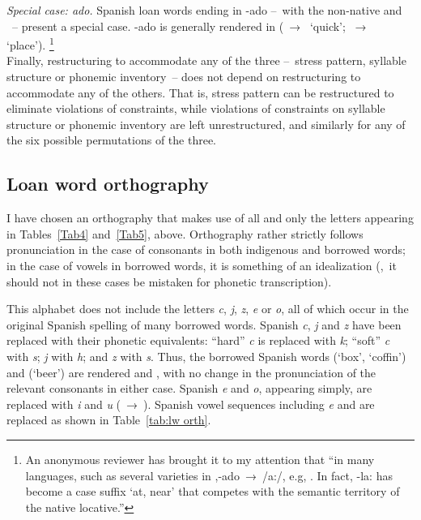 {\noindent
\textit{Special case: ado.} Spanish loan words ending in -ado --~with the non-native  and ~-- present a special case. -ado is generally rendered \textipa{[aw]} in \SYQ{} (~→~ ‘quick’; ~→~ ‘place’). \footnote{An anonymous reviewer has brought it to my attention that “in many \QI{} languages, such as several varieties in ,-ado~→~/a:/, e.g, . In fact, -la: has become a case suffix ‘at, near’ that competes with the semantic territory of the native locative.”}\\

Finally, restructuring to accommodate any of the three --~stress pattern, syllable structure or phonemic inventory~-- does not depend on restructuring to accommodate any of the others. That is, stress pattern can be restructured to eliminate violations of \SYQ{} constraints, while violations of constraints on syllable structure or phonemic inventory are left unrestructured, and similarly for any of the six possible permutations of the three.

\subsection{Loan word orthography}
I have chosen an orthography that makes use of all and only the letters appearing in Tables~\ref{Tab4} and~\ref{Tab5}, above. Orthography rather strictly follows pronunciation in the case of consonants in both indigenous and borrowed words; in the case of vowels in borrowed words, it is something of an idealization (\ie,~it should not in these cases be mistaken for phonetic transcription). 

This alphabet does not include the letters \textit{c}, \textit{j}, \textit{z}, \textit{e} or \textit{o}, all of which occur in the original Spanish spelling of many borrowed words. Spanish \textit{c}, \textit{j} and \textit{z} have been replaced with their \SYQ{} phonetic equivalents: “hard” \textit{c} is replaced with \textit{k}; “soft” \textit{c} with \textit{s}; \textit{j} with \textit{h}; and \textit{z} with \textit{s}. Thus, the borrowed Spanish words  (‘box’, ‘coffin’) and  (‘beer’) are rendered  and , with no change in the pronunciation of the relevant consonants in either case. Spanish \textit{e} and \textit{o}, appearing simply, are replaced with \textit{i} and \textit{u} (~→~). Spanish vowel sequences including \textit{e} and  are replaced as shown in Table~\ref{tab:lw orth}.

}
